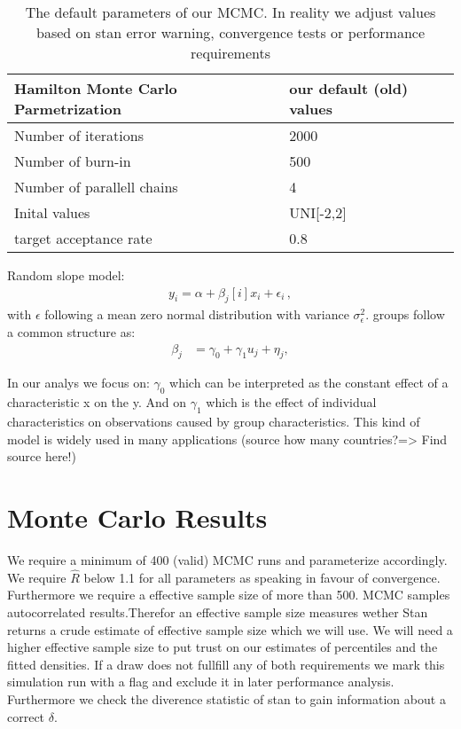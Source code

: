 \begin{table}[!ht]
\begin{center}
\begin{tabular}{l l}
Hamilton Monte Carlo Parmetrization & our default (old) values\\
\hline
Number of iterations &2000  \\
Number of burn-in & 500 \\
Number of parallell chains & 4  \\
Inital values & UNI[-2,2]  \\
target acceptance rate & 0.8  \\

\end{tabular}
\end{center}
\caption{The default parameters of our MCMC. In reality we adjust values based on stan error warning, convergence tests or performance requirements}
\label{tab:relational_table}
\end{table}


Random slope model:
\begin{align}
  y_i = \alpha + \beta_j[i] x_i + \epsilon_i \,,
\end{align}
with $\epsilon$ following a mean zero normal distribution with variance
$\sigma_{\epsilon}^2$.
groups follow a common structure as:
\begin{align}
  \beta_j &= \gamma_0 + \gamma_1 u_j + \eta_j ,
\end{align}


In our analys we focus on: $\gamma_0$ which can be interpreted as the constant effect of a characteristic x on the y.
And on $\gamma_1$ which is the effect of individual characteristics on observations caused by group characteristics. This kind of model is widely used in many applications (source how many countries?=> Find source here!)

\section{Monte Carlo Results}

We require a minimum of 400 (valid) MCMC runs and parameterize accordingly. We require $ \widehat{R}$ below 1.1 for all parameters as speaking in favour of convergence. Furthermore we require a effective sample size of more than 500. MCMC samples autocorrelated results.Therefor an effective sample size measures wether Stan returns a crude estimate of effective sample size which we will use. We will need a higher effective sample size to put trust on our estimates of percentiles and the fitted densities.
If a draw does not fullfill any of both requirements we mark this simulation run with a flag and exclude it in later performance analysis. 
Furthermore we check the diverence statistic of stan to gain information about a correct $\delta$.

